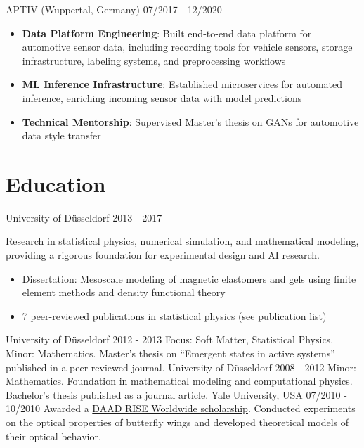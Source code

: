 \documentclass[singlesided,
               paper=a4,
               fontsize=10pt
              ]{my-resume}
\begin{document}
%
    {APTIV (Wuppertal, Germany)}
    {07/2017 - 12/2020}
    {
        \begin{itemize}[leftmargin=2em]
            \item \textbf{Data Platform Engineering}: Built end-to-end data platform for automotive sensor data, including recording tools for vehicle sensors, storage infrastructure, labeling systems, and preprocessing workflows
            \item \textbf{ML Inference Infrastructure}: Established microservices for automated inference, enriching incoming sensor data with model predictions
            \item \textbf{Technical Mentorship}: Supervised Master's thesis on GANs for automotive data style transfer
        \end{itemize}
    }

\section[\faMortarBoard]{Education}
    {University of Düsseldorf}
    {2013 - 2017}
    {
        Research in statistical physics, numerical simulation, and mathematical modeling, providing a rigorous foundation for experimental design and AI research.
        \begin{itemize}[leftmargin=2em]
            \item Dissertation: Mesoscale modeling of magnetic elastomers and gels using finite element methods and density functional theory
            \item 7 peer-reviewed publications in statistical physics (see \href{https://scholar.google.com/citations?hl=de&user=MnU8ZxwAAAAJ}{publication list})
        \end{itemize}
    }
%
    {University of Düsseldorf}
    {2012 - 2013}
    {
        Focus: Soft Matter, Statistical Physics. Minor: Mathematics. Master's thesis on ``Emergent states in active systems'' published in a peer-reviewed journal.
    }
%
    {University of Düsseldorf}
    {2008 - 2012}
    {
        Minor: Mathematics. Foundation in mathematical modeling and computational physics. Bachelor's thesis published as a journal article.
    }
%
    {Yale University, USA}
    {07/2010 - 10/2010}
    {
        Awarded a \href{https://www.daad.de/rise/en/rise-worldwide/about-the-programm/}{DAAD RISE Worldwide scholarship}. Conducted experiments on the optical properties of butterfly wings and developed theoretical models of their optical behavior.
    }
\end{document}
